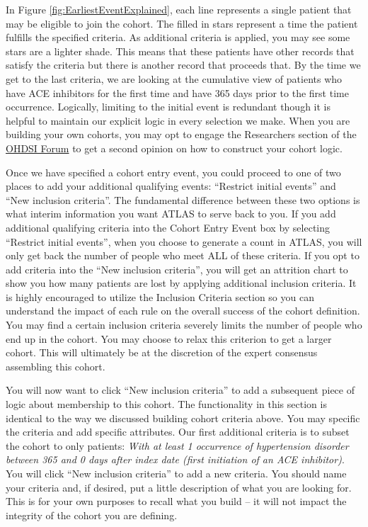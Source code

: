 \documentclass[11pt]{book}
\theoremstyle{definition}
\theoremstyle{definition}
\theoremstyle{definition}
\theoremstyle{remark}
\begin{document}
In Figure \ref{fig:EarliestEventExplained}, each line represents a single patient that may be eligible to join the cohort. The filled in stars represent a time the patient fulfills the specified criteria. As additional criteria is applied, you may see some stars are a lighter shade. This means that these patients have other records that satisfy the criteria but there is another record that proceeds that. By the time we get to the last criteria, we are looking at the cumulative view of patients who have ACE inhibitors for the first time and have 365 days prior to the first time occurrence. Logically, limiting to the initial event is redundant though it is helpful to maintain our explicit logic in every selection we make. When you are building your own cohorts, you may opt to engage the Researchers section of the \href{http://forums.ohdsi.org}{OHDSI Forum} to get a second opinion on how to construct your cohort logic.

Once we have specified a cohort entry event, you could proceed to one of two places to add your additional qualifying events: ``Restrict initial events'' and ``New inclusion criteria''. The fundamental difference between these two options is what interim information you want ATLAS to serve back to you. If you add additional qualifying criteria into the Cohort Entry Event box by selecting ``Restrict initial events'', when you choose to generate a count in ATLAS, you will only get back the number of people who meet ALL of these criteria. If you opt to add criteria into the ``New inclusion criteria'', you will get an attrition chart to show you how many patients are lost by applying additional inclusion criteria. It is highly encouraged to utilize the Inclusion Criteria section so you can understand the impact of each rule on the overall success of the cohort definition. You may find a certain inclusion criteria severely limits the number of people who end up in the cohort. You may choose to relax this criterion to get a larger cohort. This will ultimately be at the discretion of the expert consensus assembling this cohort.

You will now want to click ``New inclusion criteria'' to add a subsequent piece of logic about membership to this cohort. The functionality in this section is identical to the way we discussed building cohort criteria above. You may specific the criteria and add specific attributes. Our first additional criteria is to subset the cohort to only patients: \emph{With at least 1 occurrence of hypertension disorder between 365 and 0 days after index date (first initiation of an ACE inhibitor)}. You will click ``New inclusion criteria'' to add a new criteria. You should name your criteria and, if desired, put a little description of what you are looking for. This is for your own purposes to recall what you build -- it will not impact the integrity of the cohort you are defining.
\end{document}
